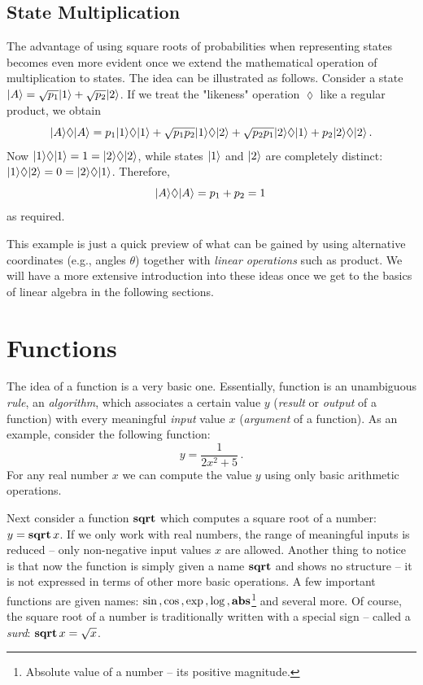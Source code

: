 \subsection{State Multiplication}
The advantage of using square roots of probabilities when representing states becomes even more evident once we extend the mathematical operation of multiplication to states. The idea can be illustrated as follows. Consider a state $|{A}\rangle=\sqrt{p_1}|{1}\rangle+\sqrt{p_2}|{2}\rangle$. If we treat the "likeness" operation $\lozenge$ like a regular product, we obtain
\[
	|{A}\rangle\lozenge|{A}\rangle=p_1|{1}\rangle\lozenge|{1}\rangle+\sqrt{p_1p_2}|{1}\rangle\lozenge|{2}\rangle+
	\sqrt{p_2p_1}|{2}\rangle\lozenge|{1}\rangle+p_2|{2}\rangle\lozenge|{2}\rangle\,.	
\]
Now $|{1}\rangle\lozenge|{1}\rangle=1=|{2}\rangle\lozenge|{2}\rangle$, while states $|{1}\rangle$ and $|{2}\rangle$ are completely distinct: $|{1}\rangle\lozenge|{2}\rangle=0=|{2}\rangle\lozenge|{1}\rangle$. Therefore,
\[
|{A}\rangle\lozenge|{A}\rangle=p_1+p_2=1\,
\]
as required.

This example is just a quick preview of what can be gained by using alternative coordinates (e.g., angles $\theta$) together with \emph{linear operations} such as product. We will have a more extensive introduction into these ideas once we get to the basics of linear algebra in the following sections.






\section{Functions}

The idea of a function is a very basic one. Essentially, function is an unambiguous \emph{rule}, an \emph{algorithm}, which associates a certain value $y$ (\emph{result} or \emph{output} of a function) with every meaningful \emph{input} value $x$ (\emph{argument} of a function). As an example, consider the following  function:
\[
y=\frac{1}{2x^2+5}\,.
\]
For any real number $x$ we can compute the value $y$ using only basic arithmetic operations. 

Next consider a function $\textrm{\bf {sqrt}}$ which computes a square root of a number: $y=\textrm{\bf {sqrt}}\,x$. If we only work with real numbers, the range of meaningful inputs is reduced -- only non-negative input values $x$ are allowed. Another thing to notice is that now the function is simply given a name  $\textrm{\bf {sqrt}}$  and shows no structure -- it is not expressed in terms of other more basic operations. A few important functions are given names: 
$\sin\,,\cos\,,\exp\,,\log\,,\textrm{\bf {abs}}$\footnote{Absolute value of a number -- its positive magnitude.} and several more. Of course, the square root of a number is traditionally written with a special sign -- called a \emph{surd}: $\textrm{\bf {sqrt}}\,x=\sqrt{x}$.

